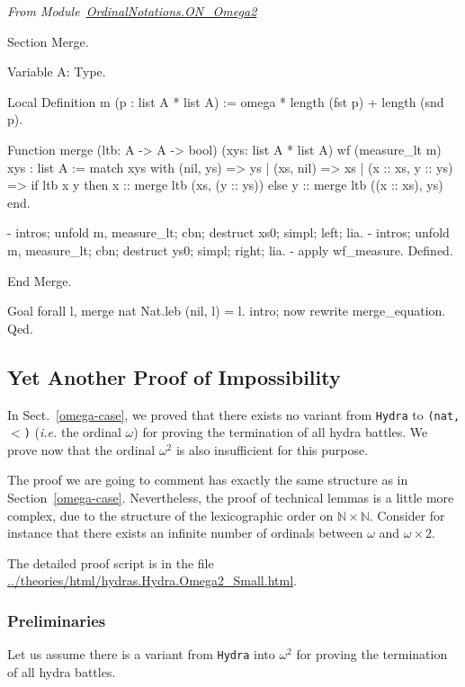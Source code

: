 
\vspace{4pt}
\noindent\emph{From Module~\href{../theories/html/hydras.OrdinalNotations.ON_Omega2.html}{OrdinalNotations.ON\_Omega2}}

\begin{Coqsrc}
Section Merge.

  Variable A: Type.

  Local Definition m (p : list A * list A) :=
    omega * length (fst p) + length (snd p).

  Function  merge  (ltb: A -> A -> bool)
          (xys: list A * list A)
          {wf (measure_lt m) xys} :
    list A :=
    match xys with
      (nil, ys) => ys
    | (xs, nil) => xs
    | (x :: xs, y :: ys) =>
      if ltb x y then x :: merge  ltb (xs, (y :: ys))
      else y :: merge  ltb ((x :: xs), ys)
    end.

  - intros; unfold m, measure_lt; cbn; destruct xs0; simpl; left; lia.
  - intros; unfold m, measure_lt; cbn; destruct ys0; simpl; right; lia.
  - apply wf_measure.
  Defined.

End Merge.

Goal forall l, merge nat Nat.leb (nil, l) = l.
  intro; now rewrite merge_equation.
Qed.
\end{Coqsrc}
 

\subsection{Yet Another  Proof of Impossibility}
\label{omega2-case}

In Sect.~\vref{omega-case}, we proved that there exists no variant from \texttt{Hydra} to \texttt{(nat,$<$)}
(\emph{i.e.} the ordinal $\omega$) for proving the termination of all hydra battles.
We  prove now that  the ordinal $\omega^2$ is also insufficient for this purpose. 

The proof we are going to comment has exactly the same structure as in Section~\ref{omega-case}.
 Nevertheless, the proof of technical  lemmas is a little more complex, due to 
 the structure of the lexicographic order on $\mathbb{N}\times\mathbb{N}$. 
Consider for instance that there exists an infinite number of ordinals  between
$\omega$ and $\omega\times 2$.



The detailed  proof script is in the file \url{../theories/html/hydras.Hydra.Omega2_Small.html}.

\subsubsection{Preliminaries}
Let us assume there is a variant from \texttt{Hydra} into $\omega^2$  for proving the   termination of all hydra battles.

